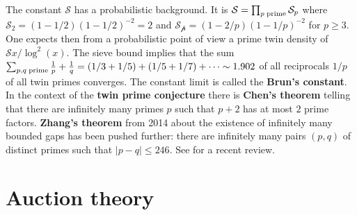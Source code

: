 \documentclass[12pt]{amsart}
\begin{document}
The constant $\mathcal{S}$ has a probabilistic background. It is 
$\mathcal{S} = \prod_{p \; {\rm prime}} \mathcal{S}_p$
where $\mathcal{S}_2=(1-1/2) (1-1/2)^{-2}=2$ and $\mathcal{S_p}=(1-2/p) (1-1/p)^{-2}$ for $p \geq 3$.
One expects then from a probabilistic point of view a prime twin density of $\mathcal{S} x/\log^2(x)$.
The sieve bound implies that the sum $\sum_{p,q \; {\rm prime}} \frac{1}{p} + \frac{1}{q} = 
(1/3+1/5) + (1/5 +1/7) + \cdots \sim 1.902$
of all reciprocals $1/p$ of all twin primes converges. The constant limit is called
the {\bf Brun's constant}. In the context of the {\bf twin prime conjecture}
there is {\bf Chen's theorem} telling that there are infinitely many 
primes $p$ such that $p+2$ has at most $2$ prime factors. 
{\bf Zhang's theorem} from 2014 about the existence of infinitely many 
bounded gaps has been pushed further: there are infinitely many pairs $(p,q)$ 
of distinct primes such that $|p-q| \leq 246$. 
See \cite{Maynard2019} for a recent review. 


\section{Auction theory}
\end{document}
